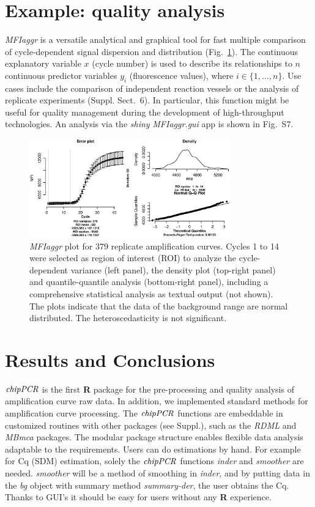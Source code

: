 \documentclass{bioinfo}
\begin{document}
\section{Example: quality analysis}

\textsl{MFIaggr} is a versatile analytical and graphical tool for fast multiple 
comparison of cycle-dependent signal dispersion and distribution 
(Fig.~\ref{fig:01}). The continuous explanatory variable $x$ (cycle number) is 
used to describe its relationships to $n$ continuous predictor variables $y_i$ 
(fluorescence values), where $i \in \{1, ..., n\}$. Use cases include the 
comparison of independent reaction vessels or the analysis of replicate 
experiments (Suppl. Sect.~6). In particular, this function might be useful for 
quality management during the development of high-throughput technologies. An 
analysis via the \emph{shiny} \textsl{MFIaggr.gui} app is shown in Fig.~S7.

\begin{figure}[!tpb]%
\centerline{\includegraphics[width=8.7cm]{fig01.eps}}
\caption{\textsl{MFIaggr} plot for 379 replicate amplification curves. Cycles 1 to 14 were 
selected as region of interest (ROI) to analyze the 
cycle-dependent variance (left panel), the density plot (top-right 
panel) and quantile-quantile analysis (bottom-right panel), including a 
comprehensive statistical analysis as textual output (not shown). The plots 
indicate that the data of the background range are normal 
distributed. The heteroscedasticity is not significant.}\label{fig:01}
\end{figure}
\section{Results and Conclusions}
$\emph{chipPCR}$ is the first \textbf{R} package for the pre-processing and 
quality analysis of amplification curve raw data. In addition, we implemented 
standard methods for amplification curve processing. The $\emph{chipPCR}$ 
functions are embeddable in customized routines with other packages (see 
Suppl.), such as the \emph{RDML} and \emph{MBmca} packages. The modular package 
structure enables flexible data analysis adaptable to the requirements. Users 
can do estimations by hand. For example for Cq (SDM) estimation, solely the 
$\emph{chipPCR}$ functions \textsl{inder} and \textsl{smoother} are needed. 
\textsl{smoother} will be a method of smoothing in \textsl{inder}, and by 
putting data in the \textsl{bg} object with summary method \textsl{summary-der}, 
the user obtains the Cq. Thanks to GUI's it should be easy for users without any 
\textbf{R} experience.
\end{document}
